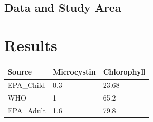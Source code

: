 \documentclass[11pt,]{article}
\begin{document}
\subsection{Data and Study Area}\label{data-and-study-area}

\section{Results}\label{results}

\begin{longtable}[c]{@{}lll@{}}
\toprule
\begin{minipage}[b]{0.13\columnwidth}\raggedright\strut
Source
\strut\end{minipage} &
\begin{minipage}[b]{0.18\columnwidth}\raggedright\strut
Microcystin
\strut\end{minipage} &
\begin{minipage}[b]{0.18\columnwidth}\raggedright\strut
Chlorophyll
\strut\end{minipage}\tabularnewline
\midrule
\endhead
\begin{minipage}[t]{0.13\columnwidth}\raggedright\strut
EPA\_Child
\strut\end{minipage} &
\begin{minipage}[t]{0.18\columnwidth}\raggedright\strut
0.3
\strut\end{minipage} &
\begin{minipage}[t]{0.18\columnwidth}\raggedright\strut
23.68
\strut\end{minipage}\tabularnewline
\begin{minipage}[t]{0.13\columnwidth}\raggedright\strut
WHO
\strut\end{minipage} &
\begin{minipage}[t]{0.18\columnwidth}\raggedright\strut
1
\strut\end{minipage} &
\begin{minipage}[t]{0.18\columnwidth}\raggedright\strut
65.2
\strut\end{minipage}\tabularnewline
\begin{minipage}[t]{0.13\columnwidth}\raggedright\strut
EPA\_Adult
\strut\end{minipage} &
\begin{minipage}[t]{0.18\columnwidth}\raggedright\strut
1.6
\strut\end{minipage} &
\begin{minipage}[t]{0.18\columnwidth}\raggedright\strut
79.8
\strut\end{minipage}\tabularnewline

\end{longtable}
\end{document}
